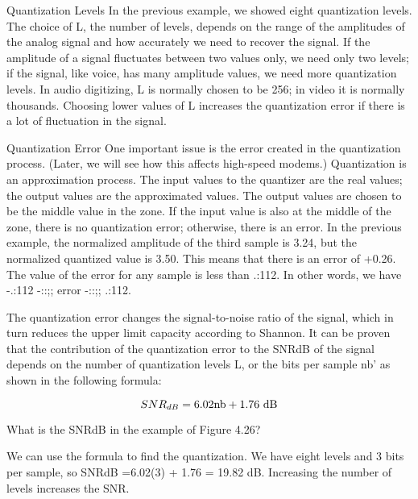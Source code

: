 Quantization Levels In the previous example, we showed eight quantization levels. The choice of L, the number of levels, depends on the range of the amplitudes of the analog signal and how accurately we need to recover the signal. If the amplitude of a signal fluctuates between two values only, we need only two levels; if the signal, like voice, has many amplitude values, we need more quantization levels. In audio digitizing, L is normally chosen to be 256; in video it is normally thousands. Choosing lower values of L increases the quantization error if there is a lot of fluctuation in the signal.

Quantization Error One important issue is the error created in the quantization process. (Later, we will see how this affects high-speed modems.) Quantization is an approximation process. The input values to the quantizer are the real values; the output values are the approximated values. The output values are chosen to be the middle value in the zone. If the input value is also at the middle of the zone, there is no quantization error; otherwise, there is an error. In the previous example, the normalized amplitude of the third sample is 3.24, but the normalized quantized value is 3.50. This means that there is an error of +0.26. The value of the error for any sample is less than .:112. In other words, we have -.:112 -::;; error -::;; .:112.

The quantization error changes the signal-to-noise ratio of the signal, which in turn reduces the upper limit capacity according to Shannon. It can be proven that the contribution of the quantization error to the SNRdB of the signal depends on the number of quantization levels L, or the bits per sample nb' as shown in the following formula:

\begin{equation}
  SNR_{dB} =6.02\textnormal{nb} + 1.76 \textnormal{ dB}
\end{equation}

\vspace{12pt}

\begin{example}
  What is the SNRdB in the example of Figure 4.26?
\end{example}

\begin{solution}
  We can use the formula to find the quantization. We have eight levels and 3 bits per sample, so SNRdB =6.02(3) + 1.76 = 19.82 dB. Increasing the number of levels increases the SNR.
\end{solution}

